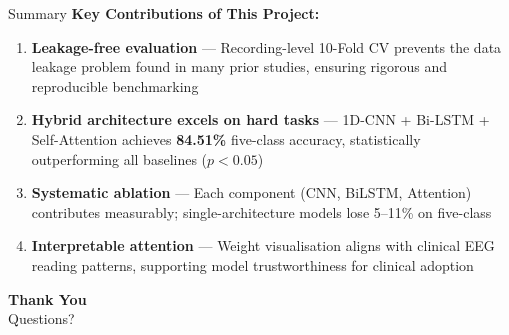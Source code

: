 \documentclass[aspectratio=169,12pt]{beamer}
\begin{document}
\begin{frame}{Summary}
\textbf{Key Contributions of This Project:}
\begin{enumerate}\itemsep4pt\small
    \item \textbf{Leakage-free evaluation} --- Recording-level 10-Fold CV prevents the data leakage problem found in many prior studies, ensuring rigorous and reproducible benchmarking
    \item \textbf{Hybrid architecture excels on hard tasks} --- 1D-CNN + Bi-LSTM + Self-Attention achieves \textbf{84.51\%} five-class accuracy, statistically outperforming all baselines ($p<0.05$)
    \item \textbf{Systematic ablation} --- Each component (CNN, BiLSTM, Attention) contributes measurably; single-architecture models lose 5--11\% on five-class
    \item \textbf{Interpretable attention} --- Weight visualisation aligns with clinical EEG reading patterns, supporting model trustworthiness for clinical adoption
\end{enumerate}

\vspace{0.3cm}
\centering
{\Large\bfseries Thank You}\\[0.2cm]
{\large Questions?}
\end{frame}
\end{document}
